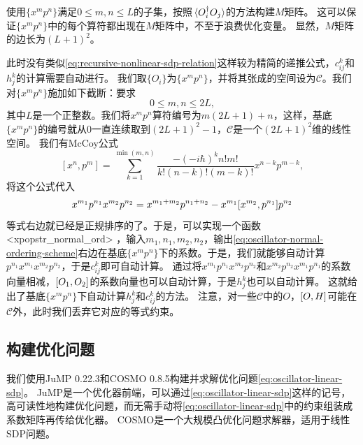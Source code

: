 \documentclass[oneside]{fduthesis}
\def\texttt#1{<#1>}%
\begin{document}
使用$\{x^m p^n\}$满足$0 \leq m, n \leq L$的子集，按照$\expval*{O_i^\dagger O_j}$的方法构建$M$矩阵。
这可以保证$\{x^m p^n\}$中的每个算符都出现在$M$矩阵中，不至于浪费优化变量。
显然，$M$矩阵的边长为$(L+1)^2$。

此时没有类似\eqref{eq:recursive-nonlinear-sdp-relation}这样较为精简的递推公式，$c_{ij}^k$和$h_j^k$的计算需要自动进行。
我们取$\{O_i\}$为$\{x^m p^n\}$，并将其张成的空间设为$\mathcal{C}$。我们对$\{x^m p^n\}$施加如下截断：要求
\begin{equation}
    0 \leq m, n \leq 2 L,
\end{equation}
其中$L$是一个正整数。我们将$x^m p^n$算符编号为$m(2L+1) + n$，这样，基底$\{x^m p^n\}$的编号就从0一直连续取到$(2L+1)^2-1$，$\mathcal{C}$是一个$(2L+1)^2$维的线性空间。
我们有McCoy公式\cite{McCoyOnCF}
\begin{equation}
    {\left[{ {x}}^{n},{ {p}}^{m}\right]=\sum _{k=1}^{\min \left(m,n\right)}{{\frac {-\left(-i\hbar \right)^{k}n!m!}{k!\left(n-k\right)!\left(m-k\right)!}}{ {x}}^{n-k}{ {p}}^{m-k}}},
\end{equation}
将这个公式代入
\begin{equation}
    {x^{m_1} p^{n_1}}{x^{m_2} p^{n_2}} = x^{m_1 + m_2} p^{n_1 + n_2} - x^{m_1} \comm{x^{m_2}}{p^{n_1}} p^{n_2}
    \label{eq:oscillator-normal-ordering-scheme}
\end{equation}
等式右边就已经是正规排序的了。于是，可以实现一个函数 \texttt{xpopstr\_normal\_ord} ，输入$m_1, n_1, m_2, n_2$，输出\eqref{eq:oscillator-normal-ordering-scheme}右边在基底$\{x^m p^n\}$下的系数。于是，我们就能够自动计算$p^{n_1} x^{m_1} x^{m_2} p^{n_2}$，于是$c^k_{ij}$即可自动计算。
通过将${x^{m_1} p^{n_1}}{x^{m_2} p^{n_2}}$和${x^{m_2} p^{n_2}}{x^{m_1} p^{n_1}}$的系数向量相减，$\comm{O_1}{O_2}$的系数向量也可以自动计算，于是$h^k_j$也可以自动计算。
这就给出了基底$\{x^m p^n\}$下自动计算$h_j^k$和$c^k_{ij}$的方法。
注意，对一些$\mathcal{C}$中的$O$，$\comm{O}{H}$可能在$\mathcal{C}$外，此时我们丢弃它对应的等式约束。

\subsection{构建优化问题}

我们使用JuMP 0.22.3\cite{DunningHuchetteLubin2017}和COSMO 0.8.5\cite{Garstka_2021}构建并求解优化问题\eqref{eq:oscillator-linear-sdp}。
JuMP是一个优化器前端，可以通过\eqref{eq:oscillator-linear-sdp}这样的记号，高可读性地构建优化问题，而无需手动将\eqref{eq:oscillator-linear-sdp}中的约束组装成系数矩阵再传给优化器。
COSMO是一个大规模凸优化问题求解器，适用于线性SDP问题。
\end{document}
